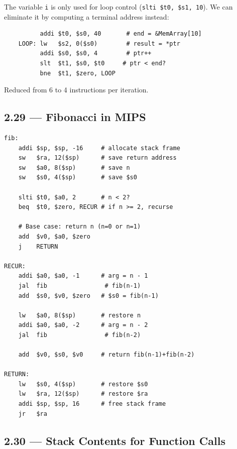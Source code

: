 The variable \texttt{i} is only used for loop control (\texttt{slti \$t0,
\$s1, 10}). We can eliminate it by computing a terminal address instead:
\begin{verbatim}
          addi $t0, $s0, 40       # end = &MemArray[10]
    LOOP: lw   $s2, 0($s0)        # result = *ptr
          addi $s0, $s0, 4        # ptr++
          slt  $t1, $s0, $t0     # ptr < end?
          bne  $t1, $zero, LOOP
\end{verbatim}
Reduced from 6 to 4 instructions per iteration.

\subsection*{2.29 --- Fibonacci in MIPS}
\hypertarget{sol-2.29}{}

\begin{verbatim}
fib:
    addi $sp, $sp, -16     # allocate stack frame
    sw   $ra, 12($sp)      # save return address
    sw   $a0, 8($sp)       # save n
    sw   $s0, 4($sp)       # save $s0

    slti $t0, $a0, 2       # n < 2?
    beq  $t0, $zero, RECUR # if n >= 2, recurse

    # Base case: return n (n=0 or n=1)
    add  $v0, $a0, $zero
    j    RETURN

RECUR:
    addi $a0, $a0, -1      # arg = n - 1
    jal  fib                # fib(n-1)
    add  $s0, $v0, $zero   # $s0 = fib(n-1)

    lw   $a0, 8($sp)       # restore n
    addi $a0, $a0, -2      # arg = n - 2
    jal  fib                # fib(n-2)

    add  $v0, $s0, $v0     # return fib(n-1)+fib(n-2)

RETURN:
    lw   $s0, 4($sp)       # restore $s0
    lw   $ra, 12($sp)      # restore $ra
    addi $sp, $sp, 16      # free stack frame
    jr   $ra
\end{verbatim}

\subsection*{2.30 --- Stack Contents for Function Calls}
\hypertarget{sol-2.30}{}

